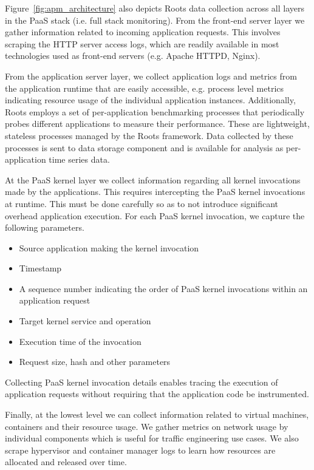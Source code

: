 Figure~\ref{fig:apm_architecture} also
depicts Roots data collection across all layers in the 
PaaS stack (i.e. full stack monitoring). 
From the front-end server layer we gather information related to incoming application
requests. This involves scraping the HTTP server access logs, which are
readily available in most technologies used as front-end
servers (e.g. Apache HTTPD, Nginx). 

From the application server layer, we collect application logs and 
metrics from the application runtime that are easily accessible, e.g. process level
metrics indicating resource usage of the individual application instances. Additionally, Roots
employs a set of per-application benchmarking processes that periodically probes 
different applications
to measure their performance. These are lightweight, stateless processes managed by the Roots framework.
Data collected by these processes is sent to data storage component and is available
for analysis as per-application time series data. 

At the PaaS kernel layer we collect information regarding all kernel invocations
made by the applications. This requires intercepting the PaaS kernel invocations
at runtime. This must be done carefully so as to not introduce significant
overhead application execution. For each PaaS kernel invocation, we capture the 
following parameters.
\begin{itemize}
\item Source application making the kernel invocation
\item Timestamp
\item A sequence number indicating the order of PaaS kernel invocations within an application request
\item Target kernel service and operation
\item Execution time of the invocation
\item Request size, hash and other parameters
\end{itemize}
Collecting PaaS kernel invocation details enables tracing the execution of application 
requests without requiring that the application code be instrumented.

Finally, at the lowest level we can collect information related to virtual machines, containers
and their resource usage. We gather metrics on network usage by individual components which
is useful for traffic engineering use cases. 
We also scrape
hypervisor and container manager logs to learn how resources are allocated and released over time.

